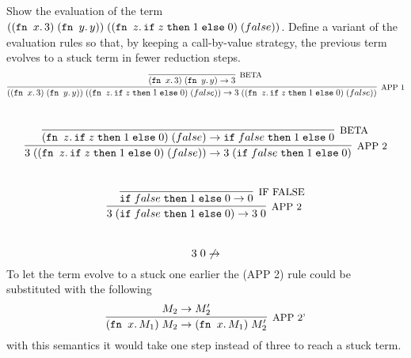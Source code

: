 \subsection{}

Show the evaluation of the term
$((\texttt{fn }x.\,3)\;(\texttt{fn }y.\,y))\;((\texttt{fn }z.\,\texttt{if}\;z\;\texttt{then}\;1\;\texttt{else}\;0)\;(false))$.
Define a variant of the evaluation rules so that, by keeping a call-by-value
strategy, the previous term evolves to a stuck term in fewer reduction steps.
\[
\infer[\text{\small{APP 1}}]
      {
	\APP{(\APP{(\FN{x}{3})}{(\FN{y}{y})})}{(\APP{(\FN{z}{\IF{z}{1}{0}})}{(false)})} \to
	\APP{3}{(\APP{(\FN{z}{\IF{z}{1}{0}})}{(false)})}
      }
      {
	\infer[\text{\small{BETA}}]
	      {
		\APP{(\FN{x}{3})}{(\FN{y}{y})} \to 3
	      }
	      {}
      }
      \]
      \\
      \[
      \infer[\text{\small{APP 2}}]
	    {
	      \APP{3}{(\APP{(\FN{z}{\IF{z}{1}{0}})}{(false)})} \to
	      \APP{3}{(\IF{false}{1}{0})}
	    }
	    {
	      \infer[\text{\small{BETA}}]
		    {
		      \APP{(\FN{z}{\IF{z}{1}{0}})}{(false)} \to \IF{false}{1}{0}
		    }
		    {}
	    }
            \]
            \\
            \[
	    \infer[\text{\small{APP 2}}]
	          {
		    \APP{3}{(\IF{false}{1}{0})} \to
		    \APP{3}{0}
	          }
	          {
		    \infer[\text{\small{IF FALSE}}]
		          {
			    \IF{false}{1}{0} \to 0
		          }
		          {}
	          }
                  \]
                  \\
                  \[
	          3\;0 \not\to
                  \]
                  To let the term evolve to a stuck one earlier the (APP 2) rule could be substituted with the following
                  \[
	          \infer[\text{\small{APP 2'}}]
	                {
		          \APP{(\FN{x}{M_1})}{M_2} \to \APP{(\FN{x}{M_1})}{M_2'}
	                }
	                {M_2 \to M_2'}
                        \]
                        with this semantics it would take one step instead of three to reach a stuck term.
